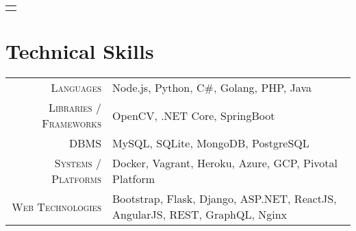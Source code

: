 \documentclass[a4paper,10pt]{extarticle} %
\begin{document}
\begin{tabular}{p{19.7cm}}
\begin{description}[style=nextline, font=$\bullet$\hspace{2mm}\normalsize]
 


\end{description}
\end{tabular}

\vspace{-0.6cm}
\section{\textcolor{primary}{Technical Skills}}

\begin{tabular}{r|p{15cm}}
\textsc{Languages} & Node.js, Python, C#, Golang, PHP, Java \\
\textsc{Libraries / Frameworks} & OpenCV, .NET Core, SpringBoot\\
\textsc{DBMS} & MySQL, SQLite, MongoDB, PostgreSQL \\
\textsc{Systems / Platforms} & Docker, Vagrant, Heroku, Azure, GCP, Pivotal Platform \\
\textsc{Web Technologies} & Bootstrap, Flask, Django, ASP.NET, ReactJS, AngularJS, REST, GraphQL, Nginx \\
\end{tabular}
\end{document}
